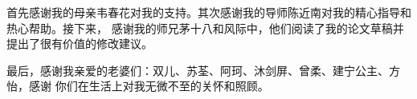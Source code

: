 \documentclass[oneside, phd]{njuthesis}
\begin{document}

\begin{thanks}
  首先感谢我的母亲韦春花对我的支持。其次感谢我的导师陈近南对我的精心指导和热心帮助。接下来，
  感谢我的师兄茅十八和风际中，他们阅读了我的论文草稿并提出了很有价值的修改建议。

  最后，感谢我亲爱的老婆们：双儿、苏荃、阿珂、沐剑屏、曾柔、建宁公主、方怡，感谢
  你们在生活上对我无微不至的关怀和照顾。
\end{thanks}

\end{document}
